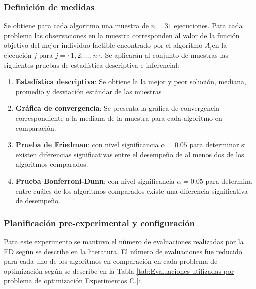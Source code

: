 \subsubsection{Definición de medidas}
Se obtiene para cada algoritmo una muestra de $n=31$ ejecuciones. Para cada problema las observaciones en la muestra corresponden al valor de la función objetivo del mejor individuo factible encontrado por el algoritmo $A_i$en la ejecución $j$ para $j= \{ 1,2,...,n\}$. Se aplicarán al conjunto de muestras las siguientes pruebas de estadística descriptiva e inferencial:
\begin{enumerate}

		\item \textbf{Estadística descriptiva}: Se obtiene la la mejor y peor solución, mediana, promedio y desviación estándar de las muestras
		\item \textbf{Gráfica de convergencia}: Se presenta la gráfica de convergencia correspondiente a la mediana de la muestra para cada algoritmo en comparación.
		\item \textbf{Prueba de Friedman}: con nivel significancia $\alpha=0.05$ para determinar si existen diferencias significativas entre el desempeño de al menos dos de los algoritmos comparados. 
		\item \textbf{Prueba Bonferroni-Dunn}: con nivel significancia $\alpha=0.05$ para determina entre cuáles de los algoritmos comparados existe una diferencia significativa de desempeño.

\end{enumerate}
\subsubsection{Planificación pre-experimental y configuración}
Para este experimento se mantuvo el número de evaluaciones realizadas por la ED según se describe en la literatura. El número de evaluaciones fue reducido para cada uno de los algoritmos en comparación en cada problema de optimización según se describe en la Tabla \ref{tab:Evaluaciones utilizadas por problema de optimización Experimentos C.}:

